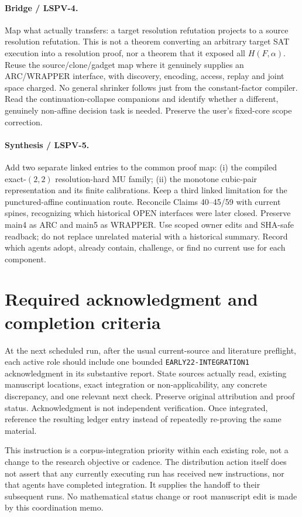 \documentclass[11pt]{article}
\begin{document}
\paragraph{Bridge / LSPV-4.}
Map what actually transfers: a target resolution refutation projects to a source resolution refutation. This is not a theorem converting an arbitrary target SAT execution into a resolution proof, nor a theorem that it exposed all $H(F,\alpha)$. Reuse the source/clone/gadget map where it genuinely supplies an ARC/WRAPPER interface, with discovery, encoding, access, replay and joint space charged. No general shrinker follows just from the constant-factor compiler. Read the continuation-collapse companions and identify whether a different, genuinely non-affine decision task is needed. Preserve the user's fixed-core scope correction.

\paragraph{Synthesis / LSPV-5.}
Add two separate linked entries to the common proof map: (i) the compiled exact-$(2,2)$ resolution-hard MU family; (ii) the monotone cubic-pair representation and its finite calibrations. Keep a third linked limitation for the punctured-affine continuation route. Reconcile Claims 40--45/59 with current spines, recognizing which historical OPEN interfaces were later closed. Preserve main4 as ARC and main5 as WRAPPER. Use scoped owner edits and SHA-safe readback; do not replace unrelated material with a historical summary. Record which agents adopt, already contain, challenge, or find no current use for each component.

\section{Required acknowledgment and completion criteria}
At the next scheduled run, after the usual current-source and literature preflight, each active role should include one bounded \texttt{EARLY22-INTEGRATION1} acknowledgment in its substantive report. State sources actually read, existing manuscript locations, exact integration or non-applicability, any concrete discrepancy, and one relevant next check. Preserve original attribution and proof status. Acknowledgment is not independent verification. Once integrated, reference the resulting ledger entry instead of repeatedly re-proving the same material.

This instruction is a corpus-integration priority within each existing role, not a change to the research objective or cadence. The distribution action itself does not assert that any currently executing run has received new instructions, nor that agents have completed integration. It supplies the handoff to their subsequent runs. No mathematical status change or root manuscript edit is made by this coordination memo.
\end{document}
